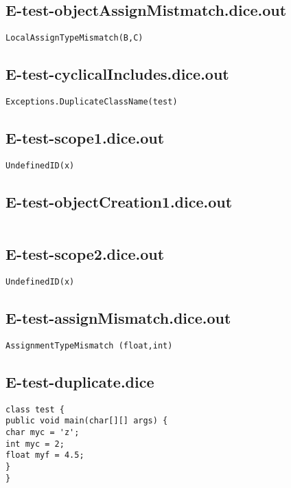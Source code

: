 \subsection{E-test-objectAssignMistmatch.dice.out}
\begin{verbatim}
LocalAssignTypeMismatch(B,C)

\end{verbatim}
\pagebreak
\subsection{E-test-cyclicalIncludes.dice.out}
\begin{verbatim}
Exceptions.DuplicateClassName(test)

\end{verbatim}
\pagebreak
\subsection{E-test-scope1.dice.out}
\begin{verbatim}
UndefinedID(x)

\end{verbatim}
\pagebreak
\subsection{E-test-objectCreation1.dice.out}
\begin{verbatim}

\end{verbatim}
\pagebreak
\subsection{E-test-scope2.dice.out}
\begin{verbatim}
UndefinedID(x)

\end{verbatim}
\pagebreak
\subsection{E-test-assignMismatch.dice.out}
\begin{verbatim}
AssignmentTypeMismatch (float,int)

\end{verbatim}
\pagebreak
\subsection{E-test-duplicate.dice}
\begin{verbatim}
class test {
public void main(char[][] args) {
char myc = 'z';
int myc = 2;
float myf = 4.5;
}
}
\end{verbatim}
\pagebreak

